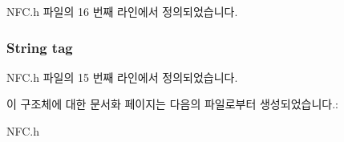 N\-F\-C.\-h 파일의 16 번째 라인에서 정의되었습니다.

\hypertarget{struct_n_d_e_f_a3d1b2b9aa7be6b4548fc2e6dbd97103f}{
\subsubsection[{tag}]{\setlength{\rightskip}{0pt plus 5cm}String tag}}\label{struct_n_d_e_f_a3d1b2b9aa7be6b4548fc2e6dbd97103f}


N\-F\-C.\-h 파일의 15 번째 라인에서 정의되었습니다.



이 구조체에 대한 문서화 페이지는 다음의 파일로부터 생성되었습니다.\-:\begin{DoxyCompactItemize}
\item 
N\-F\-C.\-h\end{DoxyCompactItemize}
